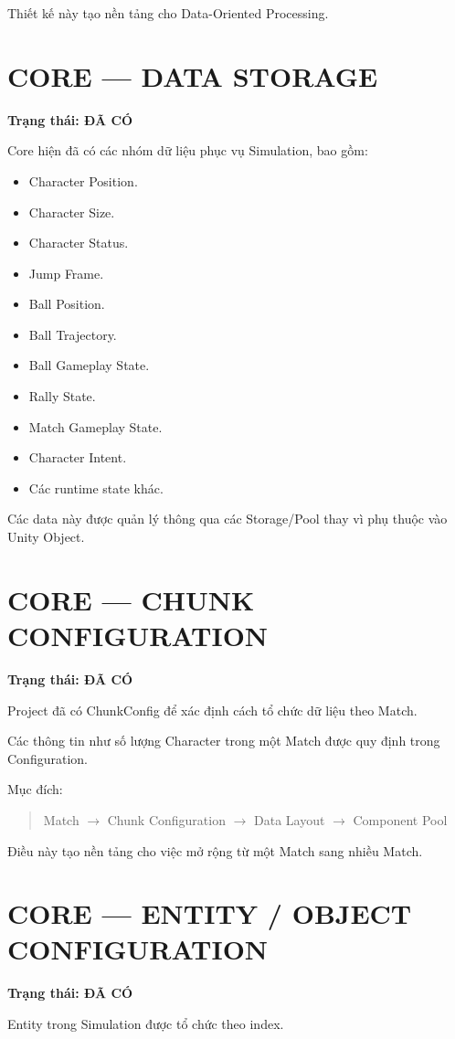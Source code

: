 \documentclass[12pt,a4paper]{article}
\newcommand{\flow}[1]{%
  \begin{quote}\centering\ttfamily #1\end{quote}%
}
\begin{document}
Thiết kế này tạo nền tảng cho Data-Oriented Processing.

\section{CORE --- DATA STORAGE}
\textbf{Trạng thái: ĐÃ CÓ}

Core hiện đã có các nhóm dữ liệu phục vụ Simulation, bao gồm:
\begin{itemize}[nosep]
  \item Character Position.
  \item Character Size.
  \item Character Status.
  \item Jump Frame.
  \item Ball Position.
  \item Ball Trajectory.
  \item Ball Gameplay State.
  \item Rally State.
  \item Match Gameplay State.
  \item Character Intent.
  \item Các runtime state khác.
\end{itemize}

Các data này được quản lý thông qua các Storage/Pool thay vì phụ thuộc vào Unity Object.

\section{CORE --- CHUNK CONFIGURATION}
\textbf{Trạng thái: ĐÃ CÓ}

Project đã có ChunkConfig để xác định cách tổ chức dữ liệu theo Match.

Các thông tin như số lượng Character trong một Match được quy định trong Configuration.

Mục đích:

\flow{Match $\rightarrow$ Chunk Configuration $\rightarrow$ Data Layout $\rightarrow$ Component Pool}

Điều này tạo nền tảng cho việc mở rộng từ một Match sang nhiều Match.

\section{CORE --- ENTITY / OBJECT CONFIGURATION}
\textbf{Trạng thái: ĐÃ CÓ}

Entity trong Simulation được tổ chức theo index.
\end{document}
